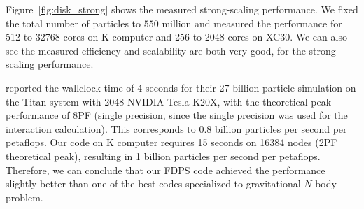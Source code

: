 Figure~\ref{fig:disk_strong} shows the measured strong-scaling
performance. We fixed the total number of particles to $550$ million
and measured the performance for 512 to 32768 cores on K computer and
256 to 2048 cores on XC30. We can also see the measured efficiency and
scalability are both very good, for the strong-scaling performance.







\citet{Bedorf:2014:PGT:2683593.2683600}
reported the wallclock time of 4 seconds for their 27-billion particle
simulation on the Titan system with 2048 NVIDIA Tesla K20X, with the
theoretical peak performance of 8PF (single precision, since the
single precision was used for the interaction calculation). This
corresponds to 0.8 billion particles per second per petaflops. Our
code on K computer requires 15 seconds on 16384 nodes (2PF theoretical
peak), resulting in 1 billion particles per second per
petaflops. Therefore, we can conclude that our FDPS code achieved the
performance slightly better than one of the best codes specialized to
gravitational $N$-body problem.

